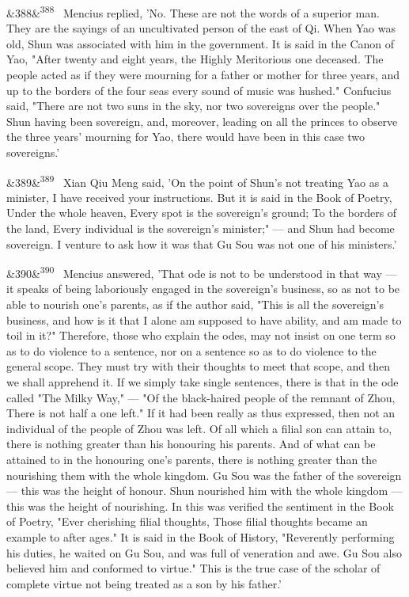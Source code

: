 \documentclass[12pt]{article}
\newcommand{\para}[1][]{\par\noindent\ifx&#1&\else\textsuperscript{\footnotesize #1}~\fi}
\begin{document}
\para[388] Mencius replied, 'No. These are not the words of a superior man. They are the sayings of an uncultivated person of the east of Qi. When Yao was old, Shun was associated with him in the government. It is said in the Canon of Yao, "After twenty and eight years, the Highly Meritorious one deceased. The people acted as if they were mourning for a father or mother for three years, and up to the borders of the four seas every sound of music was hushed." Confucius said, "There are not two suns in the sky, nor two sovereigns over the people." Shun having been sovereign, and, moreover, leading on all the princes to observe the three years' mourning for Yao, there would have been in this case two sovereigns.'

\para[389] Xian Qiu Meng said, 'On the point of Shun's not treating Yao as a minister, I have received your instructions. But it is said in the Book of Poetry, Under the whole heaven, Every spot is the sovereign's ground; To the borders of the land, Every individual is the sovereign's minister;" --- and Shun had become sovereign. I venture to ask how it was that Gu Sou was not one of his ministers.'

\para[390] Mencius answered, 'That ode is not to be understood in that way --- it speaks of being laboriously engaged in the sovereign's business, so as not to be able to nourish one's parents, as if the author said, "This is all the sovereign's business, and how is it that I alone am supposed to have ability, and am made to toil in it?" Therefore, those who explain the odes, may not insist on one term so as to do violence to a sentence, nor on a sentence so as to do violence to the general scope. They must try with their thoughts to meet that scope, and then we shall apprehend it. If we simply take single sentences, there is that in the ode called "The Milky Way," --- "Of the black-haired people of the remnant of Zhou, There is not half a one left." If it had been really as thus expressed, then not an individual of the people of Zhou was left. Of all which a filial son can attain to, there is nothing greater than his honouring his parents. And of what can be attained to in the honouring one's parents, there is nothing greater than the nourishing them with the whole kingdom. Gu Sou was the father of the sovereign --- this was the height of honour. Shun nourished him with the whole kingdom --- this was the height of nourishing. In this was verified the sentiment in the Book of Poetry, "Ever cherishing filial thoughts, Those filial thoughts became an example to after ages." It is said in the Book of History, "Reverently performing his duties, he waited on Gu Sou, and was full of veneration and awe. Gu Sou also believed him and conformed to virtue." This is the true case of the scholar of complete virtue not being treated as a son by his father.'
\end{document}
